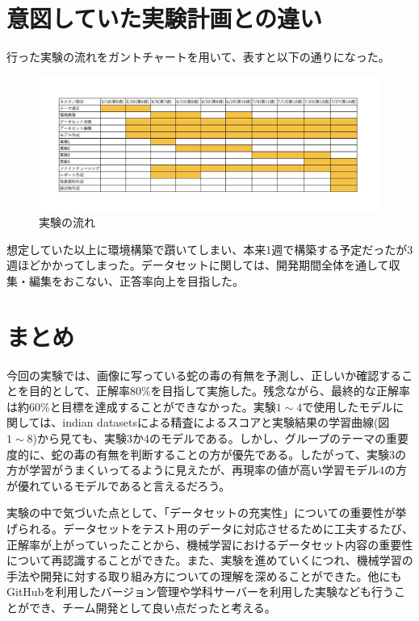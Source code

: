 \documentclass[a4paper, 11pt, titlepage]{jsarticle}
\begin{document}
\section{意図していた実験計画との違い}
行った実験の流れをガントチャートを用いて、表すと以下の通りになった。\par
\begin{figure}[htbp]
\begin{center}
\includegraphics[width=150mm]{G2_Ganttchart.jpeg}
\caption{実験の流れ}
\end{center}
\end{figure}
想定していた以上に環境構築で躓いてしまい、本来1週で構築する予定だったが3週ほどかかってしまった。データセットに関しては、開発期間全体を通して収集・編集をおこない、正答率向上を目指した。

\section{まとめ}
今回の実験では、画像に写っている蛇の毒の有無を予測し、正しいか確認することを目的として、正解率80\%を目指して実施した。残念ながら、最終的な正解率は約60\%と目標を達成することができなかった。実験$1\sim4$で使用したモデルに関しては、indian datasetsによる精査によるスコアと実験結果の学習曲線(図$1\sim8$)から見ても、実験3か4のモデルである。しかし、グループのテーマの重要度的に、蛇の毒の有無を判断することの方が優先である。したがって、実験3の方が学習がうまくいってるように見えたが、再現率の値が高い学習モデル4の方が優れているモデルであると言えるだろう。\par
実験の中で気づいた点として、「データセットの充実性」についての重要性が挙げられる。データセットをテスト用のデータに対応させるために工夫するたび、正解率が上がっていったことから、機械学習におけるデータセット内容の重要性について再認識することができた。また、実験を進めていくにつれ、機械学習の手法や開発に対する取り組み方についての理解を深めることができた。他にもGitHubを利用したバージョン管理や学科サーバーを利用した実験なども行うことができ、チーム開発として良い点だったと考える。
\end{document}
